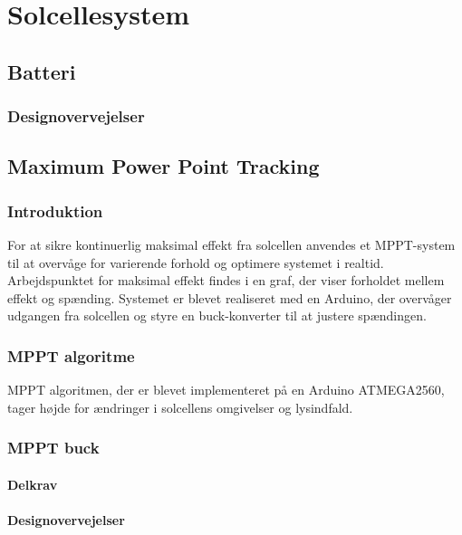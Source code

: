\documentclass[../main.tex]{subfiles}
\begin{document}
\chapter{Solcellesystem} \label{Chap:Solcellesystem}

\section{Batteri}

\subsection{Designovervejelser}

\section{Maximum Power Point Tracking}

\subsection{Introduktion}

For at sikre kontinuerlig maksimal effekt fra solcellen anvendes et MPPT-system til at overvåge for varierende forhold og optimere systemet i realtid. Arbejdspunktet for maksimal effekt findes i en graf, der viser forholdet mellem effekt og spænding. Systemet er blevet realiseret med en Arduino, der overvåger udgangen fra solcellen og styre en buck-konverter til at justere spændingen.

\subsection{MPPT algoritme}

MPPT algoritmen, der er blevet implementeret på en Arduino ATMEGA2560, tager højde for ændringer i solcellens omgivelser og lysindfald. 


\subsection{MPPT buck}

\subsubsection{Delkrav}

\subsubsection{Designovervejelser}
\end{document}
